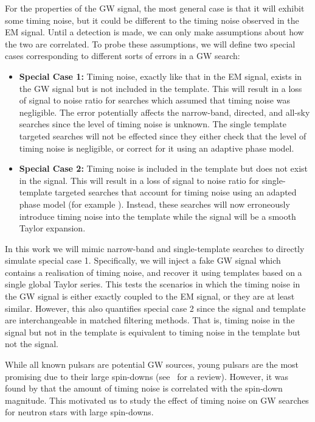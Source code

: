 \documentclass[../full_thesis/full_thesis.tex]{subfiles}
\begin{document}
For the properties of the GW signal, the most general case is that it will
exhibit some timing noise, but it could be different to the timing noise
observed in the EM signal. Until a detection is made, we can only make
assumptions about how the two are correlated. To probe these assumptions, we
will define two special cases corresponding to different sorts of errors in a
GW search:
\begin{itemize}

\item {\bf Special Case 1:} Timing noise, exactly like that in the EM signal,
exists in the GW signal but is not included in the template. This will result
in a loss of signal to noise ratio for searches which assumed that timing noise
was negligible. The error potentially affects the narrow-band, directed, and
all-sky searches since the level of timing noise is unknown. The single
template targeted searches will not be effected since they either check that
the level of timing noise is negligible, or correct for it using an adaptive
phase model.


\item {\bf Special Case 2:} Timing noise is included in the template but does
    not exist in the signal. This will result in a loss of signal to noise
    ratio for single-template targeted searches that account for timing noise
    using an adapted phase model (for example \citet{ligo2008}).  Instead,
    these searches will now erroneously introduce timing noise into the
    template while the signal will be a smooth Taylor expansion.

\end{itemize}

In this work we will mimic narrow-band and single-template searches to directly
simulate special case 1. Specifically, we will inject a fake GW signal
which contains a realisation of timing noise, and recover it using
templates based on a single global Taylor series. This tests the scenarios in
which the timing noise in the GW signal is either exactly coupled to the EM
signal, or they are at least similar.  However, this also quantifies special
case 2 since the signal and template are interchangeable in matched filtering
methods.  That is, timing noise in the signal but not in the template is
equivalent to timing noise in the template but not the signal.

While all known pulsars are potential GW sources, young pulsars are the most
promising due to their large spin-downs (see~\citet{ligo2010} for a
        review). However, it was found by \citet{Hobbs2010} that the amount of timing
noise is correlated with the spin-down  magnitude. This motivated us to study
the effect of timing noise on GW searches for neutron stars with large spin-downs.
\end{document}
